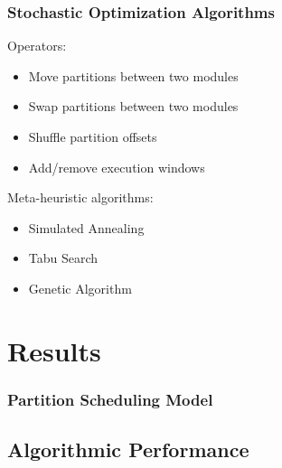 \documentclass[english, frametitlelogo, mainlogoleft, handout]{beamer}
\begin{document}
\begin{frame}
    \frametitle{Stochastic Optimization Algorithms}

    Operators:
    \begin{itemize}
        \item Move partitions between two modules
        \item Swap partitions between two modules
        \item Shuffle partition offsets
        \item Add/remove execution windows
    \end{itemize}

    \vspace{15pt}

    Meta-heuristic algorithms:
    \begin{itemize}
        \item Simulated Annealing
        \item Tabu Search
        \item Genetic Algorithm
    \end{itemize}
\end{frame}

%
%

\section{Results}

\begin{frame}
    \frametitle{Partition Scheduling Model}
\end{frame}

\subsection{Algorithmic Performance}
\end{document}
